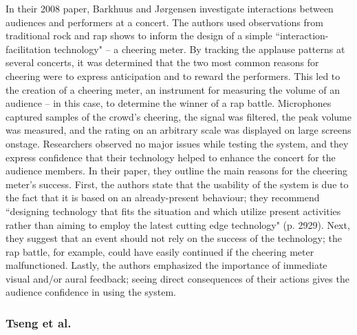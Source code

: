 In their 2008 paper, Barkhuus and J{\o}rgensen investigate interactions between audiences and performers at a concert. The authors used observations from traditional rock and rap shows to inform the design of a simple ``interaction-facilitation technology" -- a cheering meter. By tracking the applause patterns at several concerts, it was determined that the two most common reasons for cheering were to express anticipation and to reward the performers. This led to the creation of a cheering meter, an instrument for measuring the volume of an audience -- in this case, to determine the winner of a rap battle. Microphones captured samples of the crowd's cheering, the signal was filtered, the peak volume was measured, and the rating on an arbitrary scale was displayed on large screens onstage. Researchers observed no major issues while testing the system, and they express confidence that their technology helped to enhance the concert for the audience members. In their paper, they outline the main reasons for the cheering meter's success. First, the authors state that the usability of the system is due to the fact that it is based on an already-present behaviour; they recommend ``designing technology that fits the situation and which utilize present activities rather than aiming to employ the latest cutting edge technology" (p. 2929). Next, they suggest that an event should not rely on the success of the technology; the rap battle, for example, could have easily continued if the cheering meter malfunctioned. Lastly, the authors emphasized the importance of immediate visual and/or aural feedback; seeing direct consequences of their actions gives the audience confidence in using the system.

\subsubsection{Tseng et al.}

